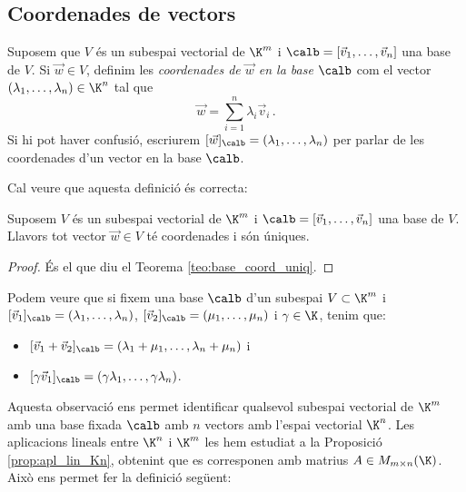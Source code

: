 \subsection{Coordenades de vectors}
\begin{definicio}
	Suposem que $V$ és un subespai vectorial de $\K^m$ i $\calb =[\vec v_1, \dots, \vec v_n]$ una base de $V$. Si $\vec w \in V$, definim les \emph{coordenades de $\vec w$ en la base $\calb$} com el vector $(\lambda_1,\dots,\lambda_n)\in\K^n$ tal que
	$$
	\vec w = \sum_{i=1}^n \lambda_i \vec v_i \,.
	$$
	Si hi pot haver confusió, escriurem $[\vec w]_\calb=(\lambda_1,\dots,\lambda_n)$ per parlar de les coordenades d'un vector en la base $\calb$.
\end{definicio}
Cal veure que aquesta definició és correcta:
\begin{teorema}
	Suposem $V$ és un subespai vectorial de $\K^m$ i $\calb =[\vec v_1, \dots, \vec v_n]$ una base de $V$. Llavors tot vector $\vec w\in V$ té coordenades i són úniques.
\end{teorema}
\begin{proof} 
    És el que diu el Teorema \ref{teo:base_coord_uniq}.
\end{proof}
\begin{observacio}
    Podem veure que si fixem una base $\calb$ d'un subespai $V\subset \K^m$ i $[\vec v_1]_\calb=(\lambda_1,\dots,\lambda_n)$, $[\vec v_2]_\calb=(\mu_1,\dots,\mu_n)$ i $\gamma \in \K$, tenim que:
    \begin{itemize}
        \item $[\vec v_1+\vec v_2]_\calb=(\lambda_1+\mu_1,\dots,\lambda_n+\mu_n)$ i
        \item $[\gamma \vec v_1]_\calb=(\gamma \lambda_1, \dots, \gamma \lambda_n)$.
    \end{itemize}
\end{observacio}
Aquesta observació ens permet identificar qualsevol subespai vectorial de $\K^m$ amb una base fixada $\calb$ amb $n$ vectors amb l'espai vectorial $\K^n$. Les aplicacions lineals entre $\K^n$ i $\K^m$ les hem estudiat a la Proposició \ref{prop:apl_lin_Kn}, obtenint que es corresponen amb matrius $A \in M_{m\times n}(\K)$. Això ens permet fer la definició següent:
